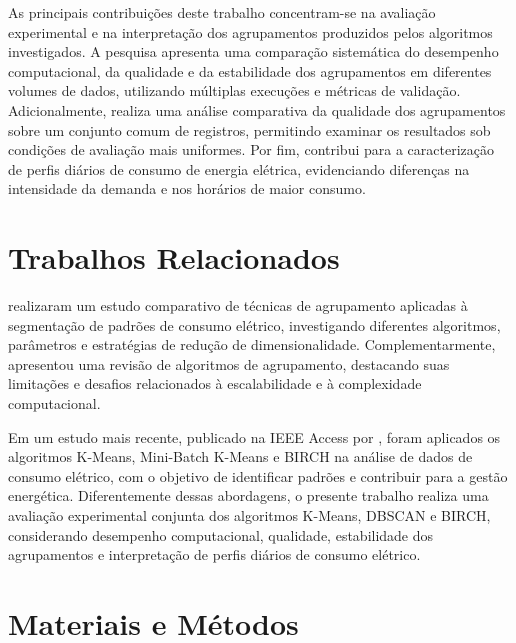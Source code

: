 \documentclass[lettersize,journal]{IEEEtran}
\begin{document}
As principais contribuições deste trabalho concentram-se na avaliação experimental e na interpretação dos agrupamentos produzidos pelos algoritmos investigados. A pesquisa apresenta uma comparação sistemática do desempenho computacional, da qualidade e da estabilidade dos agrupamentos em diferentes volumes de dados, utilizando múltiplas execuções e métricas de validação. Adicionalmente, realiza uma análise comparativa da qualidade dos agrupamentos sobre um conjunto comum de registros, permitindo examinar os resultados sob condições de avaliação mais uniformes. Por fim, contribui para a caracterização de perfis diários de consumo de energia elétrica, evidenciando diferenças na intensidade da demanda e nos horários de maior consumo.

\label{sec:introducao}





\section{Trabalhos Relacionados}
\label{sec:relacionados}
\cite{Rajabi2020} realizaram um estudo comparativo de técnicas de agrupamento aplicadas à segmentação de padrões de consumo elétrico, investigando diferentes algoritmos, parâmetros e estratégias de redução de dimensionalidade. Complementarmente, \cite{Wani2024} apresentou uma revisão de algoritmos de agrupamento, destacando suas limitações e desafios relacionados à escalabilidade e à complexidade computacional.

Em um estudo mais recente, publicado na IEEE Access por \cite{Nascimento2025}, foram aplicados os algoritmos K-Means, Mini-Batch K-Means e BIRCH na análise de dados de consumo elétrico, com o objetivo de identificar padrões e contribuir para a gestão energética. Diferentemente dessas abordagens, o presente trabalho realiza uma avaliação experimental conjunta dos algoritmos K-Means, DBSCAN e BIRCH, considerando desempenho computacional, qualidade, estabilidade dos agrupamentos e interpretação de perfis diários de consumo elétrico.




\section{Materiais e Métodos}

\label{sec:metodologia}
\end{document}
